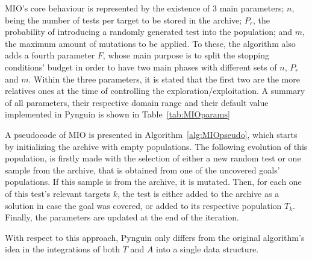 \documentclass[%
  chapterprefix=false,%
  open=right,%
  twoside=true,%
  paper=a4,%
  logofile={Figures/logo.png},%
  thesistype=master,%
  UKenglish,%
]{se2thesis}
\begin{document}
MIO's core behaviour is represented by the existence of 3 main parameters; \(n\), being the number of tests per target to be stored in the archive; \(P_r\), the probability of introducing a randomly generated test into the population; and \(m\), the maximum amount of mutations to be applied.
To these, the algorithm also adds a fourth parameter \(F\), whose main purpose is to split the stopping conditions' budget in order to have two main phases with different sets of \(n\), \(P_r\) and \(m\).
Within the three parameters, it is stated that the first two are the more relatives ones at the time of controlling the exploration/exploitation.
A summary of all parameters, their respective domain range and their default value implemented in Pynguin is shown in Table~\ref{tab:MIOparams}

A pseudocode of MIO is presented in Algorithm~\ref{alg:MIOpseudo}, which starts by initializing the archive with empty populations.
The following evolution of this population, is firstly made with the selection of either a new random test or one sample from the archive, that is obtained from one of the uncovered goals' populations.
If this sample is from the archive, it is mutated.
Then, for each one of this test's relevant targets \(k\), the test is either added to the archive as a solution in case the goal was covered, or added to its respective population \(T_k\).
Finally, the parameters are updated at the end of the iteration.

With respect to this approach, Pynguin only differs from the original algorithm's idea in the integrations of both \(T\) and \(A\) into a single data structure.
\end{document}
